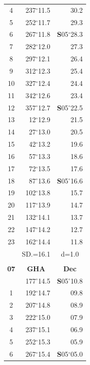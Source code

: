 \documentclass[10pt, a4paper]{report}
\begin{document}
\begin{scriptsize}
\begin{tabular*}{0.2\textwidth}[t]{@{\extracolsep{\fill}}|c|rr|}
4 & 237$^\circ$11.5 & 30.2\\
5 & 252$^\circ$11.7 & 29.3\\[2Pt]
6 & 267$^\circ$11.8 & \textbf{S}05$^\circ$28.3\\
7 & 282$^\circ$12.0 & 27.3\\
8 & 297$^\circ$12.1 & 26.4\\
9 & 312$^\circ$12.3 & \raisebox{0.24ex}{\boldmath$\cdot$~\boldmath$\cdot$~~}25.4\\
10 & 327$^\circ$12.4 & 24.4\\
11 & 342$^\circ$12.6 & 23.4\\[2Pt]
12 & 357$^\circ$12.7 & \textbf{S}05$^\circ$22.5\\
13 & 12$^\circ$12.9 & 21.5\\
14 & 27$^\circ$13.0 & 20.5\\
15 & 42$^\circ$13.2 & \raisebox{0.24ex}{\boldmath$\cdot$~\boldmath$\cdot$~~}19.6\\
16 & 57$^\circ$13.3 & 18.6\\
17 & 72$^\circ$13.5 & 17.6\\[2Pt]
18 & 87$^\circ$13.6 & \textbf{S}05$^\circ$16.6\\
19 & 102$^\circ$13.8 & 15.7\\
20 & 117$^\circ$13.9 & 14.7\\
21 & 132$^\circ$14.1 & \raisebox{0.24ex}{\boldmath$\cdot$~\boldmath$\cdot$~~}13.7\\
22 & 147$^\circ$14.2 & 12.7\\
23 & 162$^\circ$14.4 & 11.8\\
\hline
\rule{0pt}{2.4ex} & \multicolumn{1}{c}{SD.=16.1} & \multicolumn{1}{c|}{d=1.0}\\
\hline
\multicolumn{1}{c}{}\\[-0.5ex]\hline
\multicolumn{1}{|c|}{\rule{0pt}{2.6ex}\textbf{07}} & \multicolumn{1}{c}{\textbf{GHA}} & \multicolumn{1}{c|}{\textbf{Dec}}\\
\hline\rule{0pt}{2.6ex}\noindent
0 & 177$^\circ$14.5 & \textbf{S}05$^\circ$10.8\\
1 & 192$^\circ$14.7 & 09.8\\
2 & 207$^\circ$14.8 & 08.9\\
3 & 222$^\circ$15.0 & \raisebox{0.24ex}{\boldmath$\cdot$~\boldmath$\cdot$~~}07.9\\
4 & 237$^\circ$15.1 & 06.9\\
5 & 252$^\circ$15.3 & 05.9\\[2Pt]
6 & 267$^\circ$15.4 & \textbf{S}05$^\circ$05.0\\

\end{tabular*}
\end{scriptsize}
\end{document}
